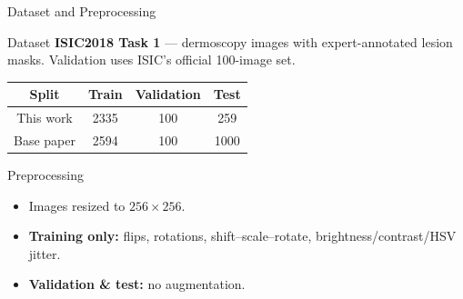 \documentclass[11pt]{beamer}
\begin{document}
\begin{frame}{Dataset and Preprocessing}
    \begin{block}{Dataset}
    \textbf{ISIC2018 Task 1} --- dermoscopy images with expert-annotated
    lesion masks. Validation uses ISIC's official 100-image set.
    \end{block}

    \begin{table}
        \centering
        \small
        \begin{tabular}{c|c|c|c}
            \hline
            \textbf{Split} & \textbf{Train} & \textbf{Validation} & \textbf{Test} \\ \hline
            This work  & 2335 & 100 & 259  \\ \hline
            Base paper & 2594 & 100 & 1000 \\ \hline
        \end{tabular}
    \end{table}

    \medskip

    \begin{block}{Preprocessing}
    \begin{itemize}
        \item Images resized to $256 \times 256$.
        \item \textbf{Training only:} flips, rotations, shift--scale--rotate,
              brightness/contrast/HSV jitter.
        \item \textbf{Validation \& test:} no augmentation.
    \end{itemize}
    \end{block}
\end{frame}
\end{document}
